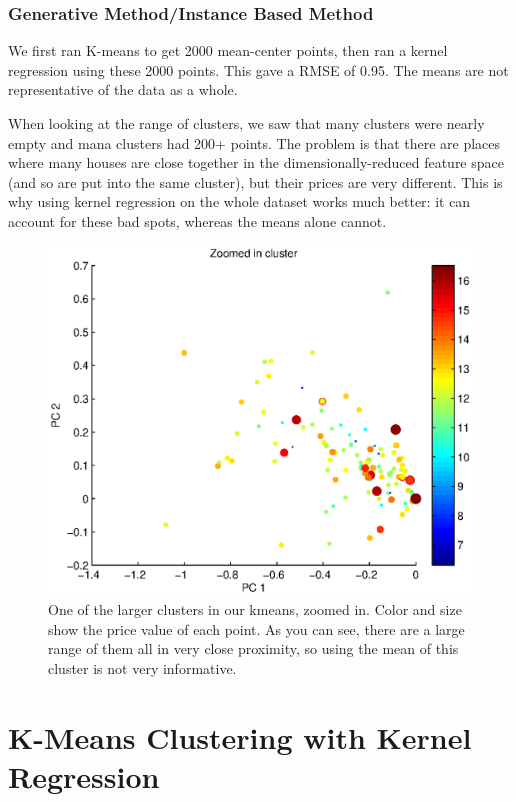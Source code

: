 \documentclass[a4paper,10pt]{article}
\begin{document}
\subsubsection*{Generative Method/Instance Based Method}
We first ran K-means to get 2000 mean-center points, then ran a kernel regression using these 2000 points. This gave a RMSE of 0.95. The means are not representative of the data as a whole.

When looking at the range of clusters, we saw that many clusters were nearly empty and mana clusters had 200+ points. The problem is that there are places where many houses are close together in the dimensionally-reduced feature space (and so are put into the same cluster), but their prices are very different. This is why using kernel regression on the whole dataset works much better: it can account for these bad spots, whereas the means alone cannot.

\begin{figure}[H]
 \centering
 \includegraphics[scale=0.5]{ZoomedInCluster.eps}
 \caption{One of the larger clusters in our kmeans, zoomed in. Color and size show the price value of each point. As you can see, there are a large range of them all in very
	  close proximity, so using the mean of this cluster is not very informative.}
\end{figure}

\section{K-Means Clustering with Kernel Regression}
\end{document}
